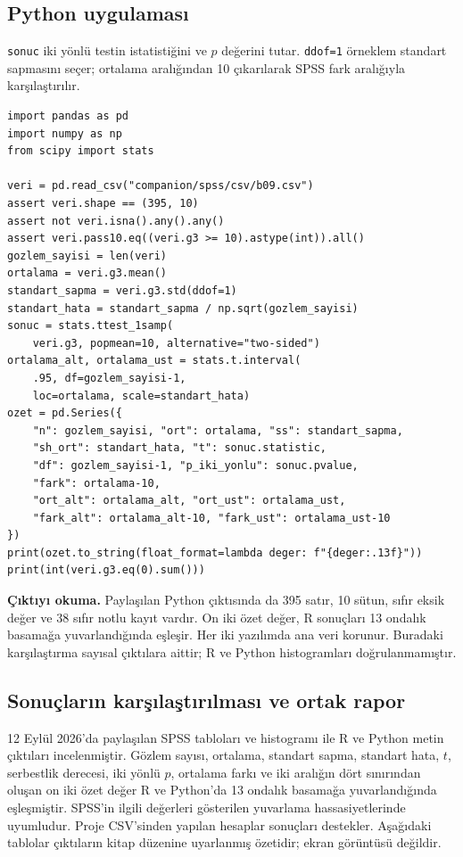 \par\noindent\begin{minipage}{\linewidth}
\subsection{Python uygulaması}
\label{sec:python-b09}

\texttt{sonuc} iki yönlü testin istatistiğini ve $p$ değerini tutar.
\texttt{ddof=1} örneklem standart sapmasını seçer; ortalama aralığından
10 çıkarılarak SPSS fark aralığıyla karşılaştırılır.

\begin{lstlisting}[style=prismPythonApp]
import pandas as pd
import numpy as np
from scipy import stats

veri = pd.read_csv("companion/spss/csv/b09.csv")
assert veri.shape == (395, 10)
assert not veri.isna().any().any()
assert veri.pass10.eq((veri.g3 >= 10).astype(int)).all()
gozlem_sayisi = len(veri)
ortalama = veri.g3.mean()
standart_sapma = veri.g3.std(ddof=1)
standart_hata = standart_sapma / np.sqrt(gozlem_sayisi)
sonuc = stats.ttest_1samp(
    veri.g3, popmean=10, alternative="two-sided")
ortalama_alt, ortalama_ust = stats.t.interval(
    .95, df=gozlem_sayisi-1,
    loc=ortalama, scale=standart_hata)
ozet = pd.Series({
    "n": gozlem_sayisi, "ort": ortalama, "ss": standart_sapma,
    "sh_ort": standart_hata, "t": sonuc.statistic,
    "df": gozlem_sayisi-1, "p_iki_yonlu": sonuc.pvalue,
    "fark": ortalama-10,
    "ort_alt": ortalama_alt, "ort_ust": ortalama_ust,
    "fark_alt": ortalama_alt-10, "fark_ust": ortalama_ust-10
})
print(ozet.to_string(float_format=lambda deger: f"{deger:.13f}"))
print(int(veri.g3.eq(0).sum()))
\end{lstlisting}

\textbf{Çıktıyı okuma.} Paylaşılan Python çıktısında da 395 satır,
10 sütun, sıfır eksik değer ve 38 sıfır notlu kayıt vardır.
On iki özet değer, R sonuçları 13 ondalık basamağa yuvarlandığında
eşleşir. Her iki yazılımda ana veri korunur. Buradaki karşılaştırma
sayısal çıktılara aittir; R ve Python histogramları doğrulanmamıştır.
\end{minipage}\par

\subsection{Sonuçların karşılaştırılması ve ortak rapor}
12 Eylül 2026'da paylaşılan SPSS tabloları ve histogramı ile R ve
Python metin çıktıları incelenmiştir. Gözlem sayısı, ortalama,
standart sapma, standart hata, $t$, serbestlik derecesi, iki yönlü
$p$, ortalama farkı ve iki aralığın dört sınırından oluşan on iki
özet değer R ve Python'da 13 ondalık basamağa yuvarlandığında
eşleşmiştir. SPSS'in ilgili değerleri gösterilen yuvarlama
hassasiyetlerinde uyumludur. Proje CSV'sinden yapılan hesaplar
sonuçları destekler. Aşağıdaki tablolar çıktıların kitap düzenine
uyarlanmış özetidir; ekran görüntüsü değildir.

